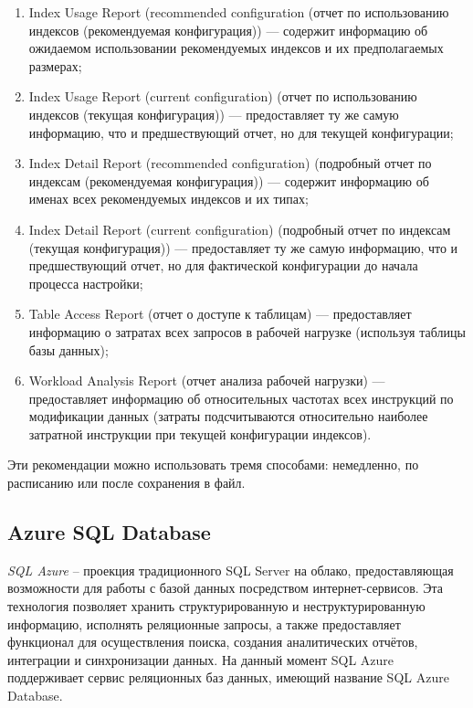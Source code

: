 \begin{enumerate}
\item Index Usage Report (recommended configuration (отчет по использованию индексов (рекомендуемая конфигурация)) — содержит информацию об ожидаемом использовании рекомендуемых индексов и их предполагаемых размерах;
\item Index Usage Report (current configuration) (отчет по использованию индексов (текущая конфигурация)) — предоставляет ту же самую информацию, что и предшествующий отчет, но для текущей конфигурации;
\item  Index Detail Report (recommended configuration) (подробный отчет по индексам (рекомендуемая конфигурация)) — содержит информацию об именах всех рекомендуемых индексов и их типах;
\item Index Detail Report (current configuration) (подробный отчет по индексам (текущая конфигурация)) — предоставляет ту же самую информацию, что и предшествующий отчет, но для фактической конфигурации до начала процесса настройки;
\item Table Access Report (отчет о доступе к таблицам) — предоставляет информацию о затратах всех запросов в рабочей нагрузке (используя таблицы базы данных);
\item Workload Analysis Report (отчет анализа рабочей нагрузки) — предоставляет информацию об относительных частотах всех инструкций по модификации данных (затраты подсчитываются относительно наиболее затратной инструкции при текущей конфигурации индексов).
\end{enumerate}

Эти рекомендации можно использовать тремя способами: немедленно, по расписанию или после сохранения в файл. \cite{petkovich:sql-server-2012}

\subsection{Azure SQL Database}

\textit{SQL Azure} – проекция традиционного SQL Server на облако, предоставляющая возможности для работы с базой данных посредством интернет-сервисов. Эта технология позволяет хранить структурированную и неструктурированную информацию, исполнять реляционные запросы, а также предоставляет функционал для осуществления поиска, создания аналитических отчётов, интеграции и синхронизации данных. На данный момент SQL Azure поддерживает сервис реляционных баз данных, имеющий название SQL Azure Database. 

